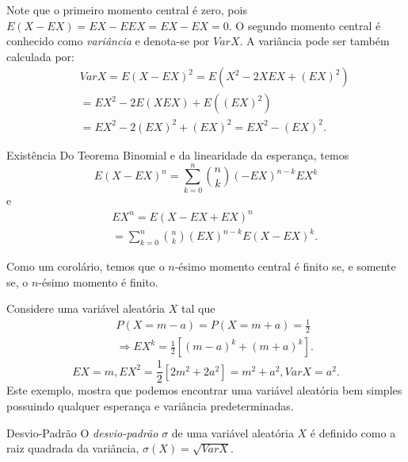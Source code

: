 \begin{frame}
Note que o primeiro momento central é zero, pois
$E(X-EX)=EX-EEX=EX-EX=0$. O segundo momento central é conhecido como
{\em variância} e denota-se por $Var X$. A variância pode ser também
calculada por:
\begin{eqnarray}
& & Var X=E(X-EX)^2=E(X^2-2XEX+(EX)^2)\nonumber\\
& & =EX^2-2E(XEX)+E((EX)^2)
\nonumber\\
& & =EX^2-2(EX)^2+(EX)^2=EX^2-(EX)^2.\nonumber
\end{eqnarray}

\begin{block}{Existência}
Do Teorema
Binomial e da linearidade da esperança, temos
$$E(X-EX)^n=\sum_{k=0}^{n}\binom{n}{k}(-EX)^{n-k}EX^k$$
e
\begin{eqnarray}
& & EX^n=E(X-EX+EX)^n \nonumber\\
& & =\sum_{k=0}^{n}\binom{n}{k}(EX)^{n-k}E(X-EX)^k.\nonumber
\end{eqnarray}

Como um corolário, temos que o $n$-ésimo momento central é finito se,
e somente se, o $n$-ésimo momento é finito.

\end{block}
\end{frame}
%
\begin{frame}
%
%
\begin{exem}
Considere uma variável aleatória $X$ tal que
\begin{eqnarray}
& & P(X=m-a)=P(X=m+a)=\frac{1}{2}
\nonumber\\
& & \Rightarrow EX^k=\frac{1}{2}[(m-a)^k+(m+a)^k].\nonumber
\end{eqnarray}
$$EX=m,EX^2=\frac{1}{2}[2m^2+2a^2]=m^2+a^2,Var X=a^2.$$
Este exemplo, mostra que podemos encontrar uma variável aleatória
bem simples possuindo qualquer esperança e variância
predeterminadas.
\end{exem}
%
%
\begin{block}{Desvio-Padrão}
%
%
O {\em desvio-padrão} $\sigma$ de uma variável aleatória $X$ é
definido como a raiz quadrada da variância, $\sigma(X)=\sqrt{Var
X}$.


\end{block}
\end{frame}
